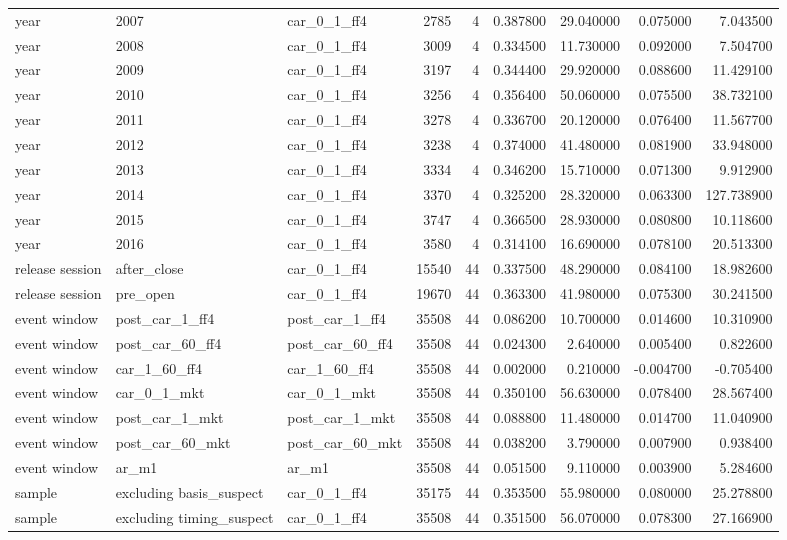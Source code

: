 \begin{table}
\begin{tabular}{lllrrrrrr}
year & 2007 & car\_0\_1\_ff4 & 2785 & 4 & 0.387800 & 29.040000 & 0.075000 & 7.043500 \\
year & 2008 & car\_0\_1\_ff4 & 3009 & 4 & 0.334500 & 11.730000 & 0.092000 & 7.504700 \\
year & 2009 & car\_0\_1\_ff4 & 3197 & 4 & 0.344400 & 29.920000 & 0.088600 & 11.429100 \\
year & 2010 & car\_0\_1\_ff4 & 3256 & 4 & 0.356400 & 50.060000 & 0.075500 & 38.732100 \\
year & 2011 & car\_0\_1\_ff4 & 3278 & 4 & 0.336700 & 20.120000 & 0.076400 & 11.567700 \\
year & 2012 & car\_0\_1\_ff4 & 3238 & 4 & 0.374000 & 41.480000 & 0.081900 & 33.948000 \\
year & 2013 & car\_0\_1\_ff4 & 3334 & 4 & 0.346200 & 15.710000 & 0.071300 & 9.912900 \\
year & 2014 & car\_0\_1\_ff4 & 3370 & 4 & 0.325200 & 28.320000 & 0.063300 & 127.738900 \\
year & 2015 & car\_0\_1\_ff4 & 3747 & 4 & 0.366500 & 28.930000 & 0.080800 & 10.118600 \\
year & 2016 & car\_0\_1\_ff4 & 3580 & 4 & 0.314100 & 16.690000 & 0.078100 & 20.513300 \\
release session & after\_close & car\_0\_1\_ff4 & 15540 & 44 & 0.337500 & 48.290000 & 0.084100 & 18.982600 \\
release session & pre\_open & car\_0\_1\_ff4 & 19670 & 44 & 0.363300 & 41.980000 & 0.075300 & 30.241500 \\
event window & post\_car\_1\_ff4 & post\_car\_1\_ff4 & 35508 & 44 & 0.086200 & 10.700000 & 0.014600 & 10.310900 \\
event window & post\_car\_60\_ff4 & post\_car\_60\_ff4 & 35508 & 44 & 0.024300 & 2.640000 & 0.005400 & 0.822600 \\
event window & car\_1\_60\_ff4 & car\_1\_60\_ff4 & 35508 & 44 & 0.002000 & 0.210000 & -0.004700 & -0.705400 \\
event window & car\_0\_1\_mkt & car\_0\_1\_mkt & 35508 & 44 & 0.350100 & 56.630000 & 0.078400 & 28.567400 \\
event window & post\_car\_1\_mkt & post\_car\_1\_mkt & 35508 & 44 & 0.088800 & 11.480000 & 0.014700 & 11.040900 \\
event window & post\_car\_60\_mkt & post\_car\_60\_mkt & 35508 & 44 & 0.038200 & 3.790000 & 0.007900 & 0.938400 \\
event window & ar\_m1 & ar\_m1 & 35508 & 44 & 0.051500 & 9.110000 & 0.003900 & 5.284600 \\
sample & excluding basis\_suspect & car\_0\_1\_ff4 & 35175 & 44 & 0.353500 & 55.980000 & 0.080000 & 25.278800 \\
sample & excluding timing\_suspect & car\_0\_1\_ff4 & 35508 & 44 & 0.351500 & 56.070000 & 0.078300 & 27.166900 \\
\bottomrule
\end{tabular}
\end{table}

